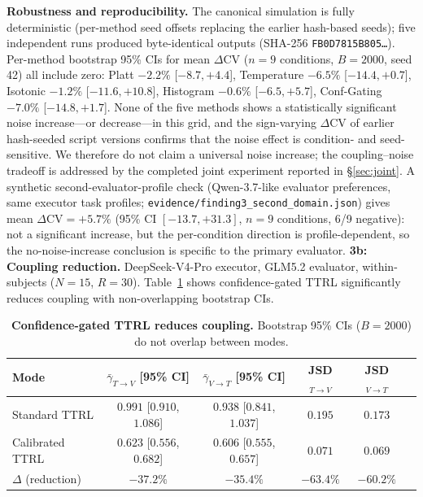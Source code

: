 \documentclass[11pt]{article}
\newcommand{\CV}{\ensuremath{\mathrm{CV}}}
\theoremstyle{definition}
\theoremstyle{remark}
\begin{document}
\textbf{Robustness and reproducibility.} The canonical simulation is fully deterministic (per-method seed offsets replacing the earlier hash-based seeds); five independent runs produced byte-identical outputs (SHA-256 \texttt{FB0D7815B805\ldots}). Per-method bootstrap 95\% CIs for mean $\Delta\CV$ ($n{=}9$ conditions, $B{=}2000$, seed 42) all include zero: Platt $-2.2\%$ [$-8.7, +4.4$], Temperature $-6.5\%$ [$-14.4, +0.7$], Isotonic $-1.2\%$ [$-11.6, +10.8$], Histogram $-0.6\%$ [$-6.5, +5.7$], Conf-Gating $-7.0\%$ [$-14.8, +1.7$]. None of the five methods shows a statistically significant noise increase---or decrease---in this grid, and the sign-varying $\Delta\CV$ of earlier hash-seeded script versions confirms that the noise effect is condition- and seed-sensitive. We therefore do not claim a universal noise increase; the coupling--noise tradeoff is addressed by the completed joint experiment reported in \S\ref{sec:joint}. A synthetic second-evaluator-profile check (Qwen-3.7-like evaluator preferences, same executor task profiles; \texttt{evidence/finding3\_second\_domain.json}) gives mean $\Delta\CV = +5.7\%$ (95\% CI $[-13.7, +31.3]$, $n{=}9$ conditions, 6/9 negative): not a significant increase, but the per-condition direction is profile-dependent, so the no-noise-increase conclusion is specific to the primary evaluator.
\textbf{3b: Coupling reduction.} DeepSeek-V4-Pro executor, GLM5.2 evaluator, within-subjects ($N{=}15$, $R{=}30$). Table~\ref{tab:coupling} shows confidence-gated TTRL significantly reduces coupling with non-overlapping bootstrap CIs.

\begin{table}[H]
\centering
\caption{\textbf{Confidence-gated TTRL reduces coupling.} Bootstrap 95\% CIs ($B{=}2000$) do not overlap between modes.}
\label{tab:coupling}
\begin{tabular}{@{}lccccc@{}}
\toprule
Mode & $\bar{\gamma}_{T \to V}$ [95\% CI] & $\bar{\gamma}_{V \to T}$ [95\% CI] & JSD$_{T \to V}$ & JSD$_{V \to T}$ \\
\midrule
Standard TTRL & $0.991$ [$0.910$, $1.086$] & $0.938$ [$0.841$, $1.037$] & $0.195$ & $0.173$ \\
Calibrated TTRL & $0.623$ [$0.556$, $0.682$] & $0.606$ [$0.555$, $0.657$] & $0.071$ & $0.069$ \\
\midrule
$\Delta$ (reduction) & $-37.2\%$ & $-35.4\%$ & $-63.4\%$ & $-60.2\%$ \\
\bottomrule
\end{tabular}
\end{table}
\end{document}
